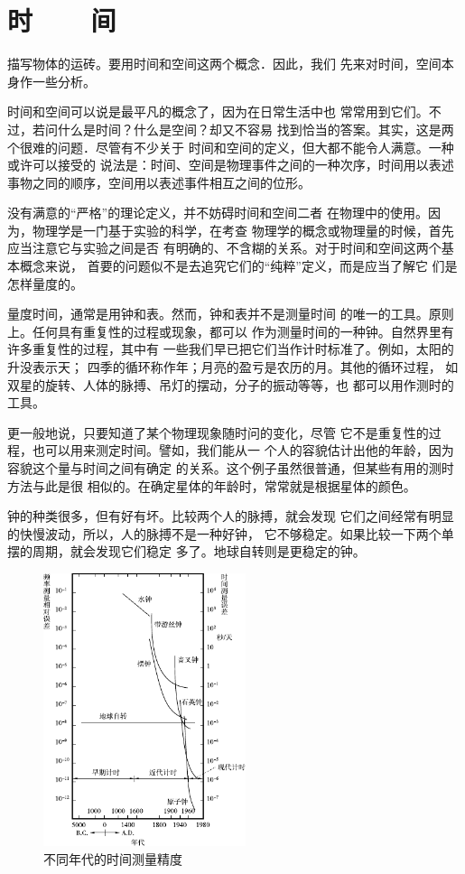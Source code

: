 \section[时间]{时~~~~间}\label{sec:01.01}

描写物体的运砖。要用时间和空间这两个概念．因此，我们
先来对时间，空间本身作一些分析。

时间和空间可以说是最平凡的概念了，因为在日常生活中也
常常用到它们。不过，若问什么是时间？什么是空间？却又不容易
找到恰当的答案。其实，这是两个很难的问题．尽管有不少关于
时间和空间的定义，但大都不能令人满意。一种或许可以接受的
说法是：时间、空间是物理事件之间的一种次序，时间用以表述
事物之同的顺序，空间用以表述事件相互之间的位形。

没有满意的“严格”的理论定义，并不妨碍时间和空间二者
在物理中的使用。因为，物理学是一门基于实验的科学，在考查
物理学的概念或物理量的时候，首先应当注意它与实验之间是否
有明确的、不含糊的关系。对于时间和空间这两个基本概念来说，
首要的问题似不是去追究它们的“纯粹”定义，而是应当了解它
们是怎样量度的。

量度时间，通常是用钟和表。然而，钟和表并不是测量时间
的唯一的工具。原则上。任何具有重复性的过程或现象，都可以
作为测量时间的一种钟。自然界里有许多重复性的过程，其中有
一些我们早已把它们当作计时标准了。例如，太阳的升没表示天；
四季的循环称作年；月亮的盈亏是农历的月。其他的循环过程，
如双星的旋转、人体的脉搏、吊灯的摆动，分子的振动等等，也
都可以用作测时的工具。

更一般地说，只要知道了某个物理现象随时问的变化，尽管
它不是重复性的过程，也可以用来测定时间。譬如，我们能从一
个人的容貌估计出他的年龄，因为容貌这个量与时间之间有确定
的关系。这个例子虽然很普通，但某些有用的测时方法与此是很
相似的。在确定星体的年龄时，常常就是根据星体的颜色。

钟的种类很多，但有好有坏。比较两个人的脉搏，就会发现
它们之间经常有明显的快慢波动，所以，人的脉搏不是一种好钟，
它不够稳定。如果比较一下两个单摆的周期，就会发现它们稳定
多了。地球自转则是更稳定的钟。
\begin{figure}[!h]
    \centering
    \includegraphics[height=8cm]{figure/fig01.01}
    \caption{不同年代的时间测量精度}
    \label{fig:01.01}
\end{figure}

